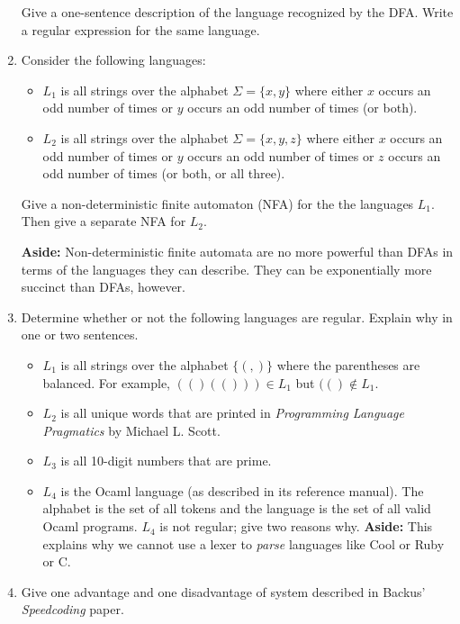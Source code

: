 \documentclass[12pt]{article}
\begin{document}
\begin{enumerate}
\vspace{-0.5in}
Give a one-sentence description of the language recognized by the DFA.
Write a regular expression for the same language. 

\item

Consider the following languages: 
\begin{itemize}
\item $L_1$ is all strings over the alphabet $\Sigma = \{x,y\}$ where either
$x$ occurs an odd number of times or $y$ occurs an odd number of times (or
both). 
\item $L_2$ is all strings over the alphabet $\Sigma = \{x,y,z\}$ where either
$x$ occurs an odd number of times or $y$ occurs an odd number of times 
or $z$ occurs an odd number of times (or both, or all three). 
\end{itemize} 

Give a non-deterministic finite automaton (NFA) for the 
the languages $L_1$. Then give a separate NFA for $L_2$. 

{\bf Aside:} Non-deterministic finite automata are no more powerful than
DFAs in terms of the languages they can describe. They can be exponentially
more succinct than DFAs, however. 

\item 
Determine whether or not the following languages are regular. Explain why
in one or two sentences.

\begin{itemize} 

\item $L_1$ is all strings over the alphabet $\{(,)\}$ where the
parentheses are balanced. For example, $(()(())) \in L_1$ but 
$(() \notin L_1$. 

\item $L_2$ is all unique words that are printed in \emph{Programming
Language Pragmatics} by Michael L. Scott. 

\item $L_3$ is all 10-digit numbers that are prime. 

\item $L_4$ is the Ocaml language (as described in its reference manual).
The alphabet is the set of all tokens and the language is the set of all
valid Ocaml programs. $L_4$ is not regular; give two reasons why. {\bf
Aside:} This explains why we cannot use a lexer to \emph{parse} languages
like Cool or Ruby or C. 

\end{itemize} 

\item Give one advantage and one disadvantage of system described in
Backus' \emph{Speedcoding} paper. 

\end{enumerate} 
\end{document}
